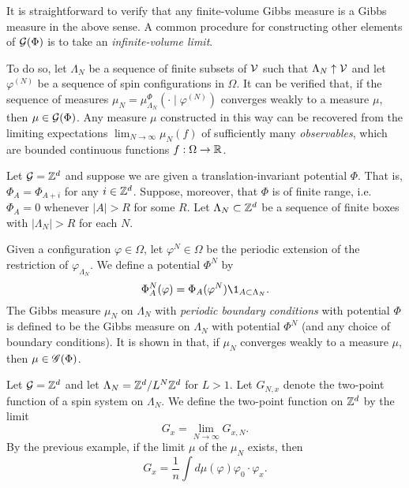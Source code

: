 It is straightforward to verify that any finite-volume Gibbs measure is a Gibbs measure
in the above sense. A common procedure for constructing other elements of $\mathcal{G}(\Phi)$
is to take an \emph{infinite-volume limit}.

To do so, let $\Lambda_N$ be a sequence of finite subsets of $\mathcal{V}$ such that
$\Lambda_N \uparrow \mathcal{V}$
and let $\varphi^{(N)}$ be a sequence of spin configurations in $\Omega$. It can be verified
that, if the sequence of measures $\mu_N = \mu^\Phi_{\Lambda_N}(\cdot \mid \varphi^{(N)})$ converges weakly
to a measure $\mu$, then $\mu\in\mathcal{G}(\Phi)$. Any measure $\mu$ constructed in this way
can be recovered from the limiting expectations $\lim_{N\to\infty} \mu_N(f)$ of sufficiently
many \emph{observables}, which are bounded continuous functions $f : \Omega \rightarrow {\mathbb R}$.

\begin{example}
Let $\mathcal{G} = { {{\mathbb Z}}^d }$ and suppose we are given a translation-invariant potential $\Phi$.
That is, $\Phi_A = \Phi_{A + i}$ for any $i \in { {{\mathbb Z}}^d }$.
Suppose, moreover, that $\Phi$ is of finite range, i.e.\ $\Phi_A = 0$ whenever
$|A| > R$ for some $R$. Let $\Lambda_N \subset { {{\mathbb Z}}^d }$ be a sequence of finite boxes
with $|\Lambda_N| > R$ for each $N$.

Given a configuration $\varphi \in \Omega$, let $\varphi^N \in \Omega$
be the periodic extension of the restriction of $\varphi_{\Lambda_N}$.
We define a potential $\Phi^N$ by
\begin{equation}
\Phi^N_A(\varphi) = \Phi_A(\varphi^N) \1_{A \subset \Lambda_N}.
\end{equation}
The Gibbs measure $\mu_N$ on $\Lambda_N$ with \emph{periodic boundary conditions}
with potential $\Phi$ is defined to be the Gibbs measure on $\Lambda_N$ with
potential $\Phi^N$ (and any choice of boundary conditions).
It is shown in \cite[Example 4.20]{Georgii11} that, if $\mu_N$ converges weakly to a
measure $\mu$, then $\mu \in \mathscr{G}(\Phi)$.
\end{example}

\begin{example}
Let $\mathcal{G} = { {{\mathbb Z}}^d }$ and let $\Lambda_N = { {{\mathbb Z}}^d }/L^N{ {{\mathbb Z}}^d }$ for $L > 1$.
Let $G_{N,x}$ denote the two-point function of a spin system on $\Lambda_N$.
We define the two-point function on ${ {{\mathbb Z}}^d }$ by the limit
\begin{equation}
G_x = \lim_{N\to\infty} G_{x,N}.
\end{equation}
By the previous example, if the limit $\mu$ of the $\mu_N$ exists, then
\begin{equation}
G_x = \frac{1}{n} \int d\mu(\varphi) \varphi_0 \cdot \varphi_x.
\end{equation}
\end{example}

